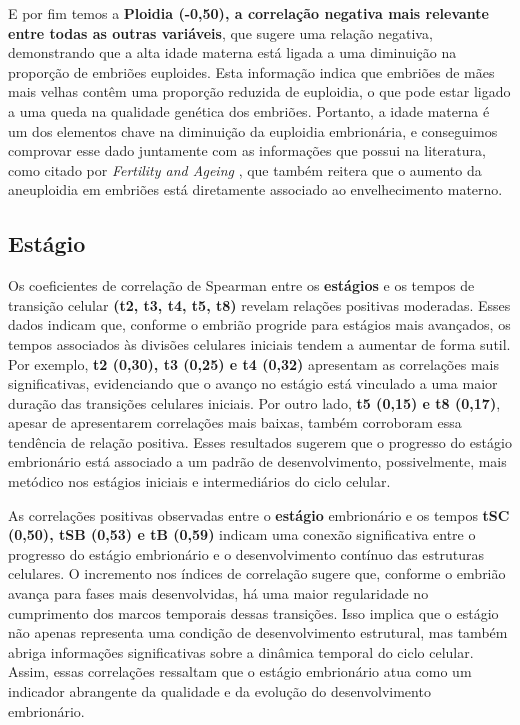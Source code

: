 E por fim temos a \textbf{Ploidia (-0,50), a correlação negativa mais relevante entre todas as outras variáveis}, que sugere uma relação negativa, demonstrando que a alta idade materna está ligada a uma diminuição na proporção de embriões euploides. Esta informação indica que embriões de mães mais velhas contêm uma proporção reduzida de euploidia, o que pode estar ligado a uma queda na qualidade genética dos embriões. Portanto, a idade materna é um dos elementos chave na diminuição da euploidia embrionária, e conseguimos comprovar esse dado juntamente com as informações que possui na literatura, como citado por \textit{Fertility and Ageing} \cite{eshre2005}, que também reitera que o aumento da aneuploidia em embriões está diretamente associado ao envelhecimento materno.

\subsection*{Estágio}
Os coeficientes de correlação de Spearman entre os \textbf{estágios} e os tempos de transição celular \textbf{(t2, t3, t4, t5, t8)} revelam relações positivas moderadas. Esses dados indicam que, conforme o embrião progride para estágios mais avançados, os tempos associados às divisões celulares iniciais tendem a aumentar de forma sutil. Por exemplo, \textbf{t2 (0,30), t3 (0,25) e t4 (0,32)} apresentam as correlações mais significativas, evidenciando que o avanço no estágio está vinculado a uma maior duração das transições celulares iniciais. Por outro lado, \textbf{t5 (0,15) e t8 (0,17)}, apesar de apresentarem correlações mais baixas, também corroboram essa tendência de relação positiva. Esses resultados sugerem que o progresso do estágio embrionário está associado a um padrão de desenvolvimento, possivelmente, mais metódico nos estágios iniciais e intermediários do ciclo celular.

As correlações positivas observadas entre o \textbf{estágio} embrionário e os tempos \textbf{tSC (0,50), tSB (0,53) e tB (0,59)} indicam uma conexão significativa entre o progresso do estágio embrionário e o desenvolvimento contínuo das estruturas celulares. O incremento nos índices de correlação sugere que, conforme o embrião avança para fases mais desenvolvidas, há uma maior regularidade no cumprimento dos marcos temporais dessas transições. Isso implica que o estágio não apenas representa uma condição de desenvolvimento estrutural, mas também abriga informações significativas sobre a dinâmica temporal do ciclo celular. Assim, essas correlações ressaltam que o estágio embrionário atua como um indicador abrangente da qualidade e da evolução do desenvolvimento embrionário.

